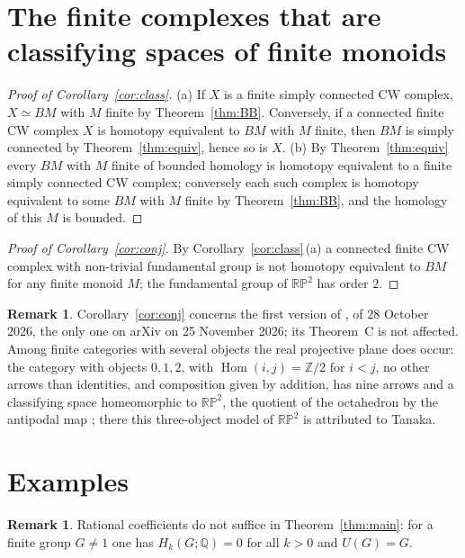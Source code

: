 \documentclass[11pt,a4paper]{article}
\theoremstyle{definition}
\newtheorem{remark}[theorem]{Remark}
\newcommand{\Z}{\mathbb{Z}}
\newcommand{\Q}{\mathbb{Q}}
\newcommand{\RP}{\mathbb{RP}}
\newcommand{\Hom}{\operatorname{Hom}}
\begin{document}
\section{The finite complexes that are classifying spaces of finite monoids}
\label{sec:class}

\begin{proof}[Proof of Corollary~\ref{cor:class}]
(a) If $X$ is a finite simply connected CW complex, $X\simeq BM$ with $M$
finite by Theorem~\ref{thm:BB}. Conversely, if a connected finite CW complex
$X$ is homotopy equivalent to $BM$ with $M$ finite, then $BM$ is simply
connected by Theorem~\ref{thm:equiv}, hence so is $X$. (b) By
Theorem~\ref{thm:equiv} every $BM$ with $M$ finite of bounded homology is
homotopy equivalent to a finite simply connected CW complex; conversely each
such complex is homotopy equivalent to some $BM$ with $M$ finite by
Theorem~\ref{thm:BB}, and the homology of this $M$ is bounded.
\end{proof}

\begin{proof}[Proof of Corollary~\ref{cor:conj}]
By Corollary~\ref{cor:class}\,(a) a connected finite CW complex with
non-trivial fundamental group is not homotopy equivalent to $BM$ for any
finite monoid $M$; the fundamental group of $\RP^2$ has order $2$.
\end{proof}

\begin{remark}\label{rem:onlyv1}
Corollary~\ref{cor:conj} concerns the first version of \cite{BB}, of 28
October 2026, the only one on arXiv on 25 November 2026; its Theorem~C is not
affected. Among finite categories with several objects the real projective
plane does occur: the category with objects $0,1,2$, with
$\Hom(i,j)=\Z/2$ for $i<j$, no other arrows than identities, and composition
given by addition, has nine arrows and a classifying space homeomorphic to
$\RP^2$, the quotient of the octahedron by the antipodal map
\cite[Theorem~6.2]{CC}; there this three-object model of $\RP^2$ is
attributed to Tanaka.
\end{remark}

\section{Examples}\label{sec:examples}

\begin{remark}\label{rem:rational}
Rational coefficients do not suffice in Theorem~\ref{thm:main}: for a finite
group $G\neq1$ one has $H_k(G;\Q)=0$ for all $k>0$ and $U(G)=G$.
\end{remark}
\end{document}
